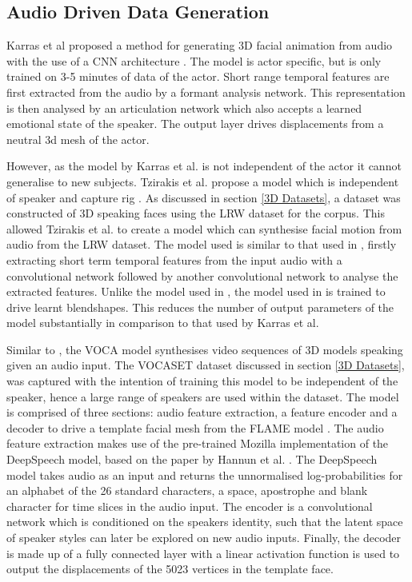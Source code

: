 \documentclass[12pt]{article}
\begin{document}
\subsection{Audio Driven Data Generation}
Karras et al proposed a method for generating 3D facial animation from audio with the use of a CNN architecture \cite{Karras2017a}.
The model is actor specific, but is only trained on 3-5 minutes of data of the actor.
Short range temporal features are first extracted from the audio by a formant analysis network.
This representation is then analysed by an articulation network which also accepts a learned emotional state of the speaker.
The output layer drives displacements from a neutral 3d mesh of the actor.

However, as the model by Karras et al. is not independent of the actor it cannot generalise to new subjects.
Tzirakis et al. propose a model which is independent of speaker and capture rig \cite{Tzirakis2019}.
As discussed in section \ref{3D Datasets}, a dataset was constructed of 3D speaking faces using the LRW dataset \cite{Chung2016} for the corpus.
This allowed Tzirakis et al. to create a model which can synthesise facial motion from audio from the LRW dataset.
The model used is similar to that used in \cite{Karras2017a}, firstly extracting short term temporal features from the input audio with a convolutional network followed by another convolutional network to analyse the extracted features.
Unlike the model used in \cite{Karras2017a}, the model used in \cite{Tzirakis2019} is trained to drive learnt blendshapes.
This reduces the number of output parameters of the model substantially in comparison to that used by Karras et al.

Similar to \cite{Tzirakis2019}, the VOCA model \cite{Cudeiro2019} synthesises video sequences of 3D models speaking given an audio input.
The VOCASET dataset discussed in section \ref{3D Datasets}, was captured with the intention of training this model to be independent of the speaker, hence a large range of speakers are used within the dataset.
The model is comprised of three sections: audio feature extraction, a feature encoder and a decoder to drive a template facial mesh from the FLAME model \cite{Li2017}.
The audio feature extraction makes use of the pre-trained Mozilla implementation of the DeepSpeech model, based on the paper by Hannun et al. \cite{Hannun2014}.
The DeepSpeech model takes audio as an input and returns the unnormalised log-probabilities for an alphabet of the 26 standard characters, a space, apostrophe and blank character for time slices in the audio input.
The encoder is a convolutional network which is conditioned on the speakers identity, such that the latent space of speaker styles can later be explored on new audio inputs.
Finally, the decoder is made up of a fully connected layer with a linear activation function is used to output the displacements of the 5023 vertices in the template face.
\end{document}
